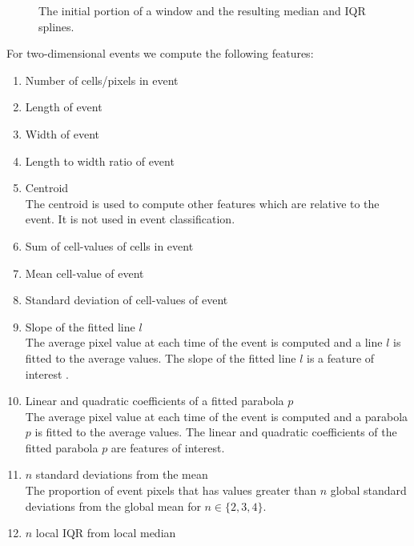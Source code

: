 \documentclass[11pt]{article}
\begin{document}
\begin{figure}[H]
{		\label{fig:Spline_IQR}
		}
		\caption{\footnotesize The initial portion of a window and the resulting median and IQR splines.} 
		\label{fig:splines}
	\end{figure}		
	 
	 
	 For two-dimensional events we compute the following features:	 
	  \begin{enumerate}
	 	\item Number of cells/pixels in event
	 	\item Length of event
	 	\item Width of event
	 	\item Length to width ratio of event
	 	\item Centroid \\
	 	The centroid is used to compute other features which are relative to the event. It is not used in  event classification.
	 	\item Sum of cell-values of cells in event
	 	\item Mean cell-value of event
	 	\item Standard deviation of cell-values of event
	 	\item Slope of the fitted line $l$ \\
	 	The average pixel value at each time of the event is computed and a line  $l$  is fitted to the average values. The slope of the fitted line $l$ is a feature of interest . 
	 	\item Linear and quadratic coefficients of a fitted parabola $p$ \\
	 	The average pixel value at each time of the event is computed and a parabola  $p$  is fitted to the average values. The linear and quadratic coefficients of the fitted parabola $p$ are features of interest. 
	 	\item $n$ standard deviations from the mean \\
	 	The proportion of event pixels that has values greater than $n$ global standard deviations from the global mean for $n \in \{2, 3, 4\}$. 
	 	\item $n$ local IQR from local median \\

\end{enumerate}
\end{document}
